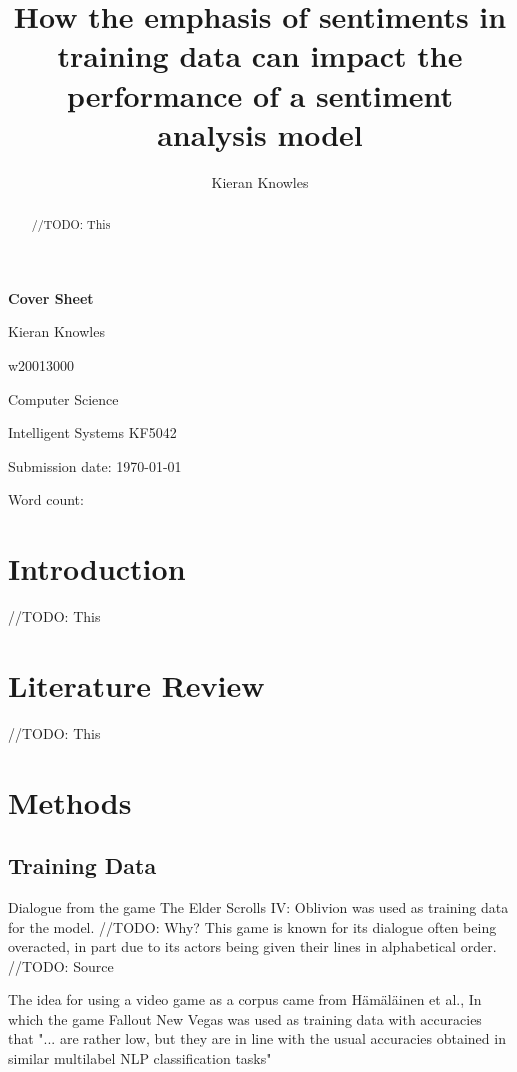 \documentclass[journal]{IEEEtran}
\newcommand\wordcount{
    
}
\begin{document}
{\Large \textbf{Cover Sheet}}

Kieran Knowles

w20013000

Computer Science

Intelligent Systems KF5042

Submission date: \today

Word count: \wordcount


\title{How the emphasis of sentiments in training data can impact the performance of a sentiment analysis model}
\author{Kieran Knowles}
\maketitle

\begin{abstract}
    //TODO: This

\end{abstract}

\section{Introduction}
//TODO: This

\section{Literature Review}
//TODO: This

\section{Methods}
\subsection{Training Data}
Dialogue from the game The Elder Scrolls IV: Oblivion was used as training data for the model. //TODO: Why?
This game is known for its dialogue often being overacted, in part due to its actors being given
their lines in alphabetical order. //TODO: Source

The idea for using a video game as a corpus came from Hämäläinen et al., \cite{hamalainen_video_2022}
In which the game Fallout New Vegas was used as training data with accuracies that
"... are rather low, but they are
in line with the usual accuracies obtained in similar multilabel NLP
classification tasks" \cite[sec. 6]{hamalainen_video_2022}
\end{document}
